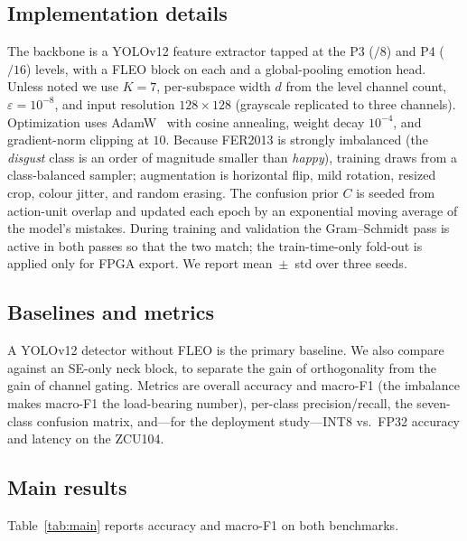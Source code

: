 \documentclass[journal]{IEEEtran}
\begin{document}
\subsection{Implementation details}
The backbone is a YOLOv12 feature extractor tapped at the P3 ($/8$) and P4
($/16$) levels, with a FLEO block on each and a global-pooling emotion head.
Unless noted we use $K=7$, per-subspace width $d$ from the level channel count,
$\varepsilon=10^{-8}$, and input resolution $128\times128$ (grayscale
replicated to three channels). Optimization uses AdamW~\cite{loshchilov2019adamw}
with cosine annealing, weight decay $10^{-4}$, and gradient-norm clipping at
$10$. Because FER2013 is strongly imbalanced (the \emph{disgust} class is an
order of magnitude smaller than \emph{happy}), training draws from a
class-balanced sampler; augmentation is horizontal flip, mild rotation,
resized crop, colour jitter, and random erasing. The confusion prior $C$ is
seeded from action-unit overlap and updated each epoch by an exponential
moving average of the model's mistakes. During training and validation the
Gram--Schmidt pass is active in both passes so that the two match; the
train-time-only fold-out is applied only for FPGA export. We report
mean~$\pm$~std over three seeds.

\subsection{Baselines and metrics}
A YOLOv12 detector without FLEO is the primary baseline. We also compare
against an SE-only neck block, to separate the gain of orthogonality from the
gain of channel gating. Metrics are overall accuracy and macro-F1 (the
imbalance makes macro-F1 the load-bearing number), per-class precision/recall,
the seven-class confusion matrix, and---for the deployment study---INT8 vs.\
FP32 accuracy and latency on the ZCU104.

\subsection{Main results}
Table~\ref{tab:main} reports accuracy and macro-F1 on both benchmarks.
\end{document}
